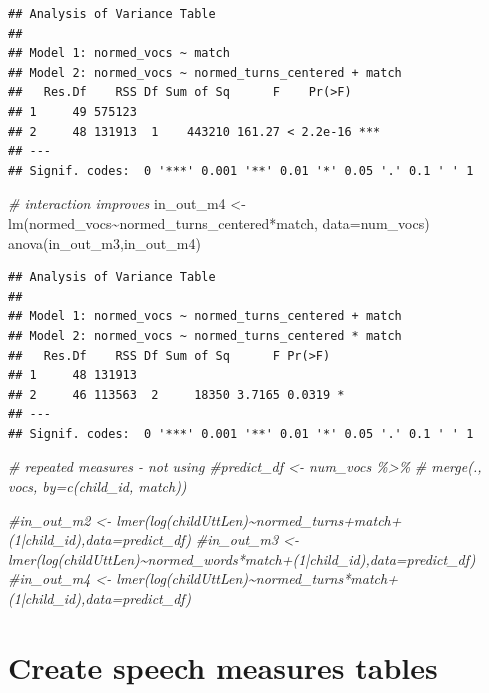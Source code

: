 \documentclass[
]{article}
\newenvironment{Shaded}{\begin{snugshade}}{\end{snugshade}}
\newcommand{\AttributeTok}[1]{\textcolor[rgb]{0.77,0.63,0.00}{#1}}
\newcommand{\CommentTok}[1]{\textcolor[rgb]{0.56,0.35,0.01}{\textit{#1}}}
\newcommand{\FunctionTok}[1]{\textcolor[rgb]{0.00,0.00,0.00}{#1}}
\newcommand{\NormalTok}[1]{#1}
\newcommand{\OtherTok}[1]{\textcolor[rgb]{0.56,0.35,0.01}{#1}}
\newcommand{\SpecialCharTok}[1]{\textcolor[rgb]{0.00,0.00,0.00}{#1}}
\begin{document}
\begin{verbatim}
## Analysis of Variance Table
## 
## Model 1: normed_vocs ~ match
## Model 2: normed_vocs ~ normed_turns_centered + match
##   Res.Df    RSS Df Sum of Sq      F    Pr(>F)    
## 1     49 575123                                  
## 2     48 131913  1    443210 161.27 < 2.2e-16 ***
## ---
## Signif. codes:  0 '***' 0.001 '**' 0.01 '*' 0.05 '.' 0.1 ' ' 1
\end{verbatim}

\begin{Shaded}
\begin{Highlighting}[]
\CommentTok{\# interaction improves }
\NormalTok{in\_out\_m4 }\OtherTok{\textless{}{-}} \FunctionTok{lm}\NormalTok{(normed\_vocs}\SpecialCharTok{\textasciitilde{}}\NormalTok{normed\_turns\_centered}\SpecialCharTok{*}\NormalTok{match, }\AttributeTok{data=}\NormalTok{num\_vocs)}
\FunctionTok{anova}\NormalTok{(in\_out\_m3,in\_out\_m4)}
\end{Highlighting}
\end{Shaded}

\begin{verbatim}
## Analysis of Variance Table
## 
## Model 1: normed_vocs ~ normed_turns_centered + match
## Model 2: normed_vocs ~ normed_turns_centered * match
##   Res.Df    RSS Df Sum of Sq      F Pr(>F)  
## 1     48 131913                             
## 2     46 113563  2     18350 3.7165 0.0319 *
## ---
## Signif. codes:  0 '***' 0.001 '**' 0.01 '*' 0.05 '.' 0.1 ' ' 1
\end{verbatim}

\begin{Shaded}
\begin{Highlighting}[]
\CommentTok{\# repeated measures {-} not using}
\CommentTok{\#predict\_df \textless{}{-} num\_vocs \%\textgreater{}\%}
\CommentTok{\#  merge(., vocs, by=c(\textquotesingle{}child\_id\textquotesingle{}, \textquotesingle{}match\textquotesingle{}))}


\CommentTok{\#in\_out\_m2 \textless{}{-} lmer(log(childUttLen)\textasciitilde{}normed\_turns+match+(1|child\_id),data=predict\_df)}
\CommentTok{\#in\_out\_m3 \textless{}{-} lmer(log(childUttLen)\textasciitilde{}normed\_words*match+(1|child\_id),data=predict\_df)}
\CommentTok{\#in\_out\_m4 \textless{}{-} lmer(log(childUttLen)\textasciitilde{}normed\_turns*match+(1|child\_id),data=predict\_df)}
\end{Highlighting}
\end{Shaded}

\hypertarget{create-speech-measures-tables}{%
\section{Create speech measures tables}\label{create-speech-measures-tables}}
\end{document}
